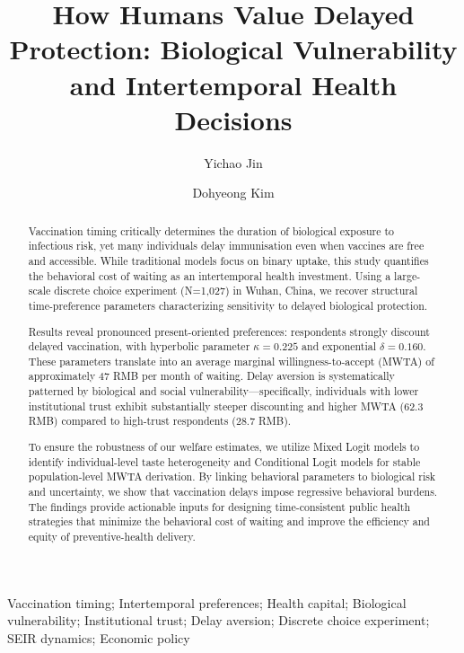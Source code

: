 \documentclass[preprint,12pt]{elsarticle}
\begin{document}
\begin{frontmatter}


\title{How Humans Value Delayed Protection: Biological Vulnerability and Intertemporal Health Decisions}

\author{Yichao Jin}
\author{Dohyeong Kim}

\address[fn1]{School of Economic, Political and Policy Sciences, The University of Texas at Dallas}

\begin{abstract}
Vaccination timing critically determines the duration of biological exposure to infectious 
risk, yet many individuals delay immunisation even when vaccines are free and accessible. 
While traditional models focus on binary uptake, this study quantifies the behavioral cost 
of waiting as an intertemporal health investment. Using a large-scale discrete choice 
experiment (N=1,027) in Wuhan, China, we recover structural time-preference parameters 
characterizing sensitivity to delayed biological protection.

Results reveal pronounced present-oriented preferences: respondents strongly discount 
delayed vaccination, with hyperbolic parameter $\kappa = 0.225$ and exponential 
$\delta = 0.160$. These parameters translate into an average marginal willingness-to-accept (MWTA) 
of approximately 47 RMB per month of waiting. Delay aversion is systematically patterned by 
biological and social vulnerability—specifically, individuals with lower 
institutional trust exhibit substantially steeper discounting and higher MWTA (62.3 RMB) 
compared to high-trust respondents (28.7 RMB). 

To ensure the robustness of our welfare estimates, we utilize Mixed Logit models to identify individual-level taste heterogeneity and Conditional Logit models for stable population-level MWTA derivation. By linking behavioral parameters to biological risk and uncertainty, we show that 
vaccination delays impose regressive behavioral burdens. The findings provide actionable inputs for designing time-consistent public health 
strategies that minimize the behavioral cost of waiting and improve the efficiency and 
equity of preventive-health delivery.
\end{abstract}

\begin{keyword}
Vaccination timing; Intertemporal preferences; Health capital; Biological vulnerability; Institutional trust; Delay aversion; Discrete choice experiment; SEIR dynamics; Economic policy
\end{keyword}

\end{frontmatter}
\end{document}
